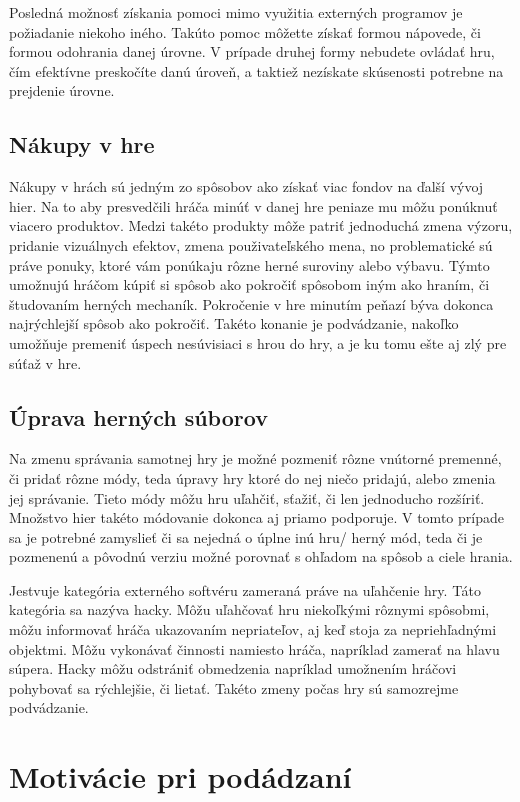 \documentclass[10pt, oneside, slovak,a4paper]{article}
\begin{document}
Posledná možnosť získania pomoci mimo využitia externých programov je požiadanie niekoho iného. Takúto pomoc môžette získať formou nápovede, či formou odohrania danej úrovne. V prípade druhej formy nebudete ovládať hru, čím efektívne preskočíte danú úroveň, a taktiež nezískate skúsenosti potrebne na prejdenie úrovne.

\subsection{Nákupy v hre}\label{nakupy}

Nákupy v hrách sú jedným zo spôsobov ako získať viac fondov na ďalší vývoj hier. Na to aby presvedčili hráča minúť v danej hre peniaze mu môžu ponúknuť viacero produktov. Medzi takéto produkty môže patriť jednoduchá zmena výzoru, pridanie vizuálnych efektov, zmena použivateľského mena, no problematické sú práve ponuky, ktoré vám ponúkaju rôzne herné suroviny alebo výbavu. Týmto umožnujú hráčom kúpiť si spôsob ako pokročiť spôsobom iným ako hraním, či študovaním herných mechaník. Pokročenie v hre minutím peňazí býva dokonca najrýchlejší spôsob ako pokročiť. Takéto konanie je podvádzanie, nakoľko umožňuje premeniť úspech nesúvisiaci s hrou do hry, a je ku tomu ešte aj zlý pre súťaž v hre.

\subsection{Úprava herných súborov}

Na zmenu správania samotnej hry je možné pozmeniť rôzne vnútorné premenné, či pridať rôzne módy, teda úpravy hry ktoré do nej niečo pridajú, alebo zmenia jej správanie. Tieto módy môžu hru uľahčiť, sťažiť, či len jednoducho rozšíriť. Množstvo hier takéto módovanie dokonca aj priamo podporuje. V tomto prípade sa je potrebné zamyslieť či sa nejedná o úplne inú hru/ herný mód, teda či je pozmenenú a pôvodnú verziu možné porovnať s ohľadom na spôsob a ciele hrania.

Jestvuje kategória externého softvéru zameraná práve na uľahčenie hry. Táto kategória sa nazýva hacky. Môžu uľahčovať hru niekoľkými rôznymi spôsobmi, môžu informovať hráča ukazovaním nepriateľov, aj keď stoja za nepriehľadnými objektmi. Môžu vykonávať činnosti namiesto hráča, napríklad zamerať na hlavu súpera. Hacky môžu odstrániť obmedzenia napríklad umožnením hráčovi pohybovať sa rýchlejšie, či lietať. Takéto zmeny počas hry sú samozrejme podvádzanie.

\section{Motivácie pri podádzaní}
\label{Motivacie}
\end{document}
